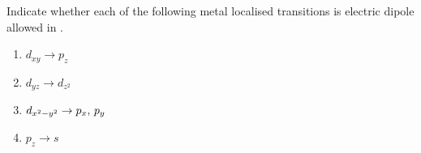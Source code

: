\begin{problem}
    Indicate whether each of the following metal localised transitions is electric dipole allowed in \ptcl.
    \begin{enumerate}
        \item $d_{xy} \to p_z$
        \item $d_{yz} \to d_{z^2}$
        \item $d_{x^2 - y^2} \to p_x,\thinspace p_y$
        \item $p_z \to s$
    \end{enumerate}
\end{problem}